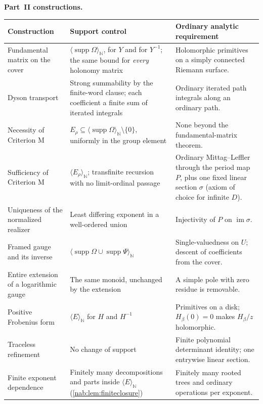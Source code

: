 \documentclass[11pt,letterpaper]{article}
\theoremstyle{definition}
\theoremstyle{remark}
\newcommand{\N}{\mathbb N}
\newcommand{\supp}{\operatorname{supp}}
\newcommand{\im}{\operatorname{im}}
\newcommand{\angles}[1]{\langle #1\rangle_{\N}}
\numberwithin{equation}{section}
\begin{document}
\medskip\noindent\textbf{Part~II constructions.}
\begin{center}\small
\begin{tabular}{@{}L{0.26\textwidth}L{0.35\textwidth}L{0.29\textwidth}@{}}
\toprule
Construction & Support control & Ordinary analytic requirement\\
\midrule
Fundamental matrix on the cover &
$\angles{\supp\Omega}$, for $Y$ and for $Y^{-1}$; the same bound for
\emph{every} holonomy matrix &
Holomorphic primitives on a simply connected Riemann surface.\\ \addlinespace[0.35em]
Dyson transport &
Strong summability by the finite-word clause; each coefficient a finite sum of
iterated integrals &
Ordinary iterated path integrals along an ordinary path.\\ \addlinespace[0.35em]
Necessity of Criterion M &
$E_\rho\subseteq\angles{\supp\Omega}\setminus\{0\}$, uniformly in the group
element &
None beyond the fundamental-matrix theorem.\\ \addlinespace[0.35em]
Sufficiency of Criterion M &
$\angles{E_\rho}$; transfinite recursion with no limit-ordinal passage &
Ordinary Mittag--Leffler through the period map $P$, plus one fixed linear
section $\sigma$ (axiom of choice for infinite $D$).\\ \addlinespace[0.35em]
Uniqueness of the normalized realizer &
Least differing exponent in a well-ordered union &
Injectivity of $P$ on $\im\sigma$.\\ \addlinespace[0.35em]
Framed gauge and its inverse &
$\angles{\supp\Omega\cup\supp\Psi}$ &
Single-valuedness on $U$; descent of coefficients from the cover.\\ \addlinespace[0.35em]
Entire extension of a logarithmic gauge &
The same monoid, unchanged by the extension &
A simple pole with zero residue is removable.\\ \addlinespace[0.35em]
Positive Frobenius form &
$\angles E$ for $H$ and $H^{-1}$ &
Primitives on a disk; $H_\beta(0)=0$ makes $H_\beta/z$ holomorphic.\\ \addlinespace[0.35em]
Traceless refinement &
No change of support &
Finite polynomial determinant identity; one entrywise linear section.\\ \addlinespace[0.35em]
Finite exponent dependence &
Finitely many decompositions and parts inside $\angles E$
(\cref{nab:lem:finiteclosure}) &
Finitely many rooted trees and ordinary operations per exponent.\\
\bottomrule
\end{tabular}
\end{center}
\end{document}
